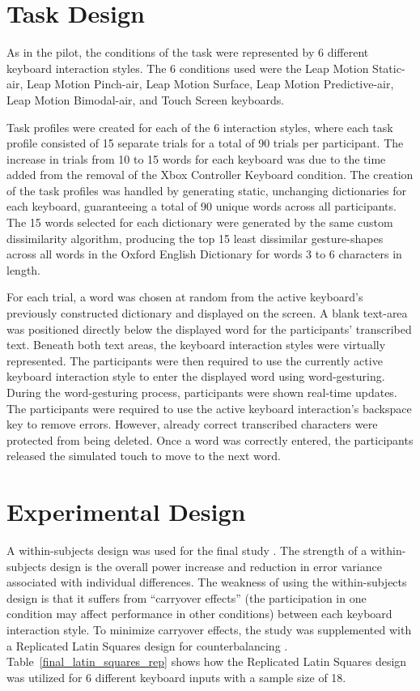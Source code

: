 \section{Task Design} \label{final_task_design}
As in the pilot, the conditions of the task were represented by 6 different keyboard interaction styles. The 6 conditions used were the Leap Motion Static-air, Leap Motion Pinch-air, Leap Motion Surface, Leap Motion Predictive-air, Leap Motion Bimodal-air, and Touch Screen keyboards.

Task profiles were created for each of the 6 interaction styles, where each task profile consisted of 15 separate trials for a total of 90 trials per participant. The increase in trials from 10 to 15 words for each keyboard was due to the time added from the removal of the Xbox Controller Keyboard condition. The creation of the task profiles was handled by generating static, unchanging dictionaries for each keyboard, guaranteeing a total of 90 unique words across all participants. The 15 words selected for each dictionary were generated by the same custom dissimilarity algorithm, producing the top 15 least dissimilar gesture-shapes across all words in the Oxford English Dictionary for words 3 to 6 characters in length.

For each trial, a word was chosen at random from the active keyboard's previously constructed dictionary and displayed on the screen. A blank text-area was positioned directly below the displayed word for the participants' transcribed text. Beneath both text areas, the keyboard interaction styles were virtually represented. The participants were then required to use the currently active keyboard interaction style to enter the displayed word using word-gesturing. During the word-gesturing process, participants were shown real-time updates. The participants were required to use the active keyboard interaction's backspace key to remove errors. However, already correct transcribed characters were protected from being deleted. Once a word was correctly entered, the participants released the simulated touch to move to the next word.

\section{Experimental Design} \label{final_experimental_design}
A within-subjects design was used for the final study \cite{ref_within_subjects}. The strength of a within-subjects design is the overall power increase and reduction in error variance associated with individual differences. The weakness of using the within-subjects design is that it suffers from ``carryover effects'' (the participation in one condition may affect performance in other conditions) between each keyboard interaction style. To minimize carryover effects, the study was supplemented with a Replicated Latin Squares design for counterbalancing \cite{ref_replicated_latin_squares}. Table~\ref{final_latin_squares_rep} shows how the Replicated Latin Squares design was utilized for 6 different keyboard inputs with a sample size of 18.

